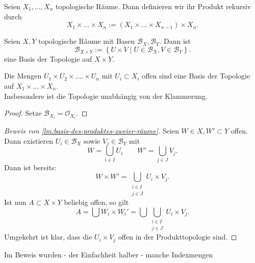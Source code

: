 \begin{ddefinition}\label{def:produkt-endlich-vieler-mengen}
Seien $X_1,\ldots,X_n$ topologische Räume. Dann definieren wir ihr Produkt rekursiv durch
\[
    X_1\times \ldots\times X_n := (X_1\times \ldots\times X_{n-1})\times X_n
.\] 
\end{ddefinition}

\begin{lemma}\label{lm:basis-des-produktes-zweier-räume}
    Seien $X,Y$ topologische Räume mit Basen  $\mathcal{B}_X, \mathcal{B}_Y$. Dann ist
    \[
    \mathcal{B}_{X\times Y} := \left \{U\times V \mid  U\in \mathcal{B}_X, V\in \mathcal{B}_Y\right\} 
    .\] 
    eine Basis der Topologie auf $X\times Y$.
\end{lemma}
\begin{corollary*}\label{cor:basis-endlicher-produkte}
    Die Mengen $U_1\times U_2\times \ldots.\times U_n$ mit $U_i\subset X_i$ offen sind eine Basis der Topologie auf $X_1\times \ldots\times X_n$. \\
    Insbesondere ist die Topologie unabhängig von der Klammerung.
\end{corollary*}
\begin{proof}
    Setze $\mathcal{B}_{X_i} = \mathcal{O}_{X_i}$.
\end{proof}
\begin{proof}[Beweis von \autoref{lm:basis-des-produktes-zweier-räume}]
    Seien $W\in X, W'\subset Y$ offen. Dann existieren $U_i \in \mathcal{B}_X$ sowie $V_j \in \mathcal{B}_Y$ mit
    \[
    W = \bigcup_{i \in  I} U_i \qquad W' = \bigcup_{j\in J} V_j 
    .\] 
    Dann ist bereits:
    \[
    W \times W' = \bigcup_{\substack{i\in I \\j\in J} } U_i \times V_j
    .\] 
    Ist nun $A\subset X\times Y$ beliebig offen, so gilt
    \[
    A = \bigcup W_i \times W_i' = \bigcup  \bigcup_{\substack{i\in I\\j\in J}  } U_i \times V_j
    .\] 
    Umgekehrt ist klar, dass die $U_i\times V_j$ offen in der Produkttopologie sind.
\end{proof}
\begin{remark*}
    Im Beweis wurden - der Einfachheit halber - manche Indexmengen  
\end{remark*}

